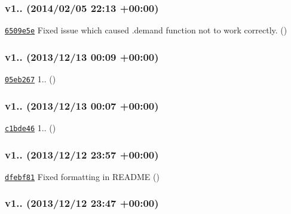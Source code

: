\subsubsection*{v1.. (2014/02/05 22\+:13 +00\+:00)}


\begin{DoxyItemize}
\item \href{https://github.com/bcoe/yargs/commit/6509e5e7dee6ef1a1f60eea104be0faa1a045075}{\tt 6509e5e} Fixed issue which caused .demand function not to work correctly. ()
\end{DoxyItemize}

\subsubsection*{v1.. (2013/12/13 00\+:09 +00\+:00)}


\begin{DoxyItemize}
\item \href{https://github.com/bcoe/yargs/commit/05eb26741c9ce446b33ff006e5d33221f53eaceb}{\tt 05eb267} 1.. ()
\end{DoxyItemize}

\subsubsection*{v1.. (2013/12/13 00\+:07 +00\+:00)}


\begin{DoxyItemize}
\item \href{https://github.com/bcoe/yargs/commit/c1bde46e37318a68b87d17a50c130c861d6ce4a9}{\tt c1bde46} 1.. ()
\end{DoxyItemize}

\subsubsection*{v1.. (2013/12/12 23\+:57 +00\+:00)}


\begin{DoxyItemize}
\item \href{https://github.com/bcoe/yargs/commit/dfebf8164c25c650701528ee581ca483a99dc21c}{\tt dfebf81} Fixed formatting in R\+E\+A\+D\+ME ()
\end{DoxyItemize}

\subsubsection*{v1.. (2013/12/12 23\+:47 +00\+:00)}


